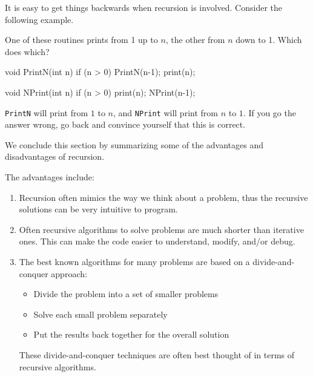It is easy to get things backwards when recursion is involved.
Consider the following example.

\begin{ques}
One of these routines prints from 1 up to $n$,
the other from $n$ down to 1.
Which does which?

\begin{minipage}{.4\textwidth}
\begin{code}
     void PrintN(int n) { 
          if (n > 0) {
             PrintN(n-1);
             print(n);
          }                          
     }
\end{code}
\end{minipage}
\hfill 
\begin{minipage}{.4\textwidth}
\begin{code}
     void NPrint(int n) {
         if (n > 0) {
            print(n);
            NPrint(n-1);
         }
     }
\end{code} 
\end{minipage}

\answerlinetwo
\begin{answer}
\verb+PrintN+ will print from $1$ to $n$, and \verb+NPrint+ will print from $n$ to $1$.
If you go the answer wrong, go back and convince yourself that this is correct.
\end{answer}
\end{ques}


We conclude this section by summarizing some of the advantages and disadvantages
of recursion.

The advantages include:
\begin{enumerate}
\item 
Recursion often mimics the way we think about a problem, thus the
recursive solutions can be very intuitive to program.
\item 
Often recursive algorithms to solve problems are much shorter than
iterative ones. This can  make the code easier to understand, modify, and/or debug.
\item  
The best known algorithms for many problems are based on
a divide-and-conquer approach:
\begin{itemize}
\item  Divide the problem into a set of smaller problems
\item  Solve each small problem separately
\item  Put the results back together for the overall solution
\end{itemize}
These divide-and-conquer techniques are often best thought of in terms of
recursive algorithms. 
\end{enumerate}


